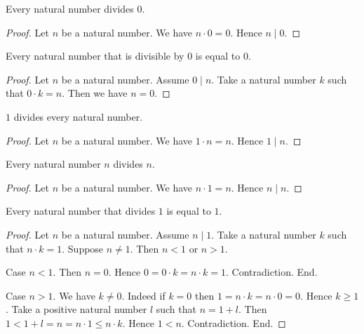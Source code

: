 \documentclass[../../natural-numbers.ftl.tex]{subfiles}
\begin{document}
  \begin{forthel}
    \begin{proposition}[NN 03 01 148842]
      Every natural number divides $0$.
    \end{proposition}
    \begin{proof}
      Let $n$ be a natural number.
      We have $n \cdot 0 = 0$.
      Hence $n \mid 0$.
    \end{proof}

    \begin{proposition}[NN 03 01 295259]
      Every natural number that is divisible by $0$ is equal to $0$.
    \end{proposition}
    \begin{proof}
      Let $n$ be a natural number.
      Assume $0 \mid n$.
      Take a natural number $k$ such that $0 \cdot k = n$.
      Then we have $n = 0$.
    \end{proof}

    \begin{proposition}[NN 03 01 856465]
      $1$ divides every natural number.
    \end{proposition}
    \begin{proof}
      Let $n$ be a natural number.
      We have $1 \cdot n = n$.
      Hence $1 \mid n$.
    \end{proof}

    \begin{proposition}[NN 03 01 258975]
      Every natural number $n$ divides $n$.
    \end{proposition}
    \begin{proof}
      Let $n$ be a natural number.
      We have $n \cdot 1 = n$.
      Hence $n \mid n$.
    \end{proof}

    \begin{proposition}[NN 03 01 211137]
      Every natural number that divides $1$ is equal to $1$.
    \end{proposition}
    \begin{proof}
      Let $n$ be a natural number.
      Assume $n \mid 1$.
      Take a natural number $k$ such that $n \cdot k = 1$.
      Suppose $n \neq 1$.
      Then $n < 1$ or $n > 1$.

      Case $n < 1$.
        Then $n = 0$.
        Hence $0 = 0 \cdot k = n \cdot k = 1$.
        Contradiction.
      End.

      Case $n > 1$.
        We have $k \neq 0$.
        Indeed if $k = 0$ then $1 = n \cdot k = n \cdot 0 = 0$.
        Hence $k \geq 1$.
        Take a positive natural number $l$ such that $n = 1 + l$.
        Then $1 < 1 + l = n = n \cdot 1 \leq n \cdot k$.
        Hence $1 < n$.
        Contradiction.
      End.
    \end{proof}


\end{forthel}
\end{document}
